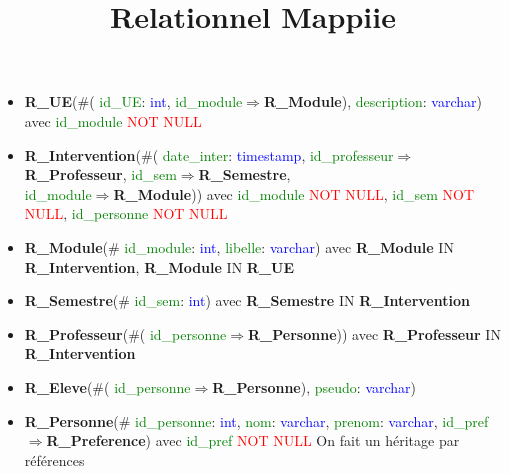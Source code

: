 \documentclass{article}
\title{Relationnel Mappiie}
\begin{document}
\maketitle

\begin{itemize}

\item \textbf{R\_UE}(\#(\textcolor{green}{ id\_UE}: \textcolor{blue}{ int}, \textcolor{green}{ id\_module}$\Rightarrow$\textbf{R\_Module}), \textcolor{green}{ description}: \textcolor{blue}{ varchar}) avec \textcolor{green}{ id\_module} \textcolor{red}{NOT NULL}\\


\item \textbf{R\_Intervention}(\#(\textcolor{green}{ date\_inter}: \textcolor{blue}{ timestamp}, \textcolor{green}{ id\_professeur}$\Rightarrow$\textbf{R\_Professeur}, \textcolor{green}{ id\_sem}$\Rightarrow$\textbf{R\_Semestre},\\
\textcolor{green}{ id\_module}$\Rightarrow$\textbf{R\_Module})) avec \textcolor{green}{ id\_module} \textcolor{red}{NOT NULL}, \textcolor{green}{ id\_sem} \textcolor{red}{NOT NULL}, \textcolor{green}{ id\_personne} \textcolor{red}{NOT NULL}\\

\item \textbf{R\_Module}(\#\textcolor{green}{ id\_module}: \textcolor{blue}{ int}, \textcolor{green}{ libelle}: \textcolor{blue}{ varchar}) avec \textbf{R\_Module} IN \textbf{R\_Intervention}, \textbf{R\_Module} IN \textbf{R\_UE}\\

\item \textbf{R\_Semestre}(\#\textcolor{green}{ id\_sem}: \textcolor{blue}{ int}) avec \textbf{R\_Semestre} IN \textbf{R\_Intervention} \\

\item \textbf{R\_Professeur}(\#(\textcolor{green}{ id\_personne}$\Rightarrow$\textbf{R\_Personne})) avec \textbf{R\_Professeur} IN \textbf{R\_Intervention} \\

\item \textbf{R\_Eleve}(\#(\textcolor{green}{ id\_personne}$\Rightarrow$\textbf{R\_Personne}), \textcolor{green}{ pseudo}: \textcolor{blue}{ varchar}) \\

\item \textbf{R\_Personne}(\#\textcolor{green}{ id\_personne}: \textcolor{blue}{ int}, \textcolor{green}{ nom}: \textcolor{blue}{ varchar}, \textcolor{green}{ prenom}: \textcolor{blue}{ varchar},\textcolor{green}{ id\_pref}$\Rightarrow$\textbf{R\_Preference}) avec \textcolor{green}{  id\_pref} \textcolor{red}{NOT NULL}       On fait un héritage par références\\



\end{itemize}
\end{document}
